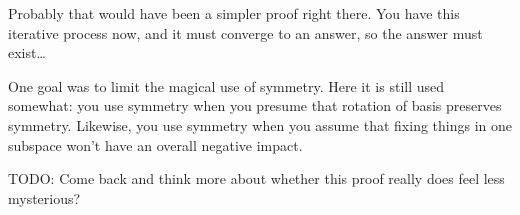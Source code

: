 \documentclass[11pt, oneside]{amsart}
\begin{document}
Probably that would have been a simpler proof right there. You have this
iterative process now, and it must converge to an answer, so the answer
must exist\dots

One goal was to limit the magical use of symmetry. Here it is still used
somewhat: you use symmetry when you presume that rotation of basis
preserves symmetry. Likewise, you use symmetry when you assume that
fixing things in one subspace won't have an overall negative impact.

TODO: Come back and think more about whether this proof really does feel
less mysterious?
\end{document}
